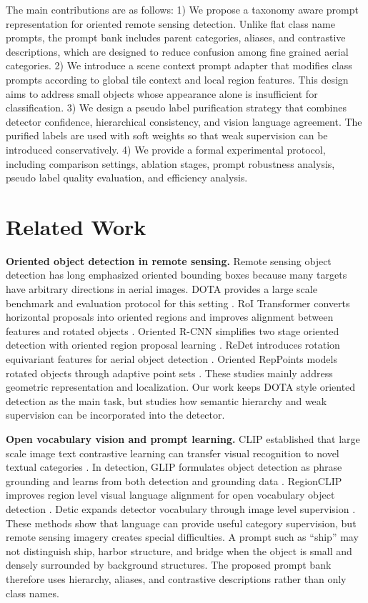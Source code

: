 \documentclass[10pt]{article}
\begin{document}
The main contributions are as follows: 
1) We propose a taxonomy aware prompt representation for oriented remote sensing detection. Unlike flat class name prompts, the prompt bank includes parent categories, aliases, and contrastive descriptions, which are designed to reduce confusion among fine grained aerial categories. 
2) We introduce a scene context prompt adapter that modifies class prompts according to global tile context and local region features. This design aims to address small objects whose appearance alone is insufficient for classification. 
3) We design a pseudo label purification strategy that combines detector confidence, hierarchical consistency, and vision language agreement. The purified labels are used with soft weights so that weak supervision can be introduced conservatively. 
4) We provide a formal experimental protocol, including comparison settings, ablation stages, prompt robustness analysis, pseudo label quality evaluation, and efficiency analysis.

\section{Related Work}

\textbf{Oriented object detection in remote sensing.}
Remote sensing object detection has long emphasized oriented bounding boxes because many targets have arbitrary directions in aerial images. DOTA provides a large scale benchmark and evaluation protocol for this setting \cite{xia2018dota}. RoI Transformer converts horizontal proposals into oriented regions and improves alignment between features and rotated objects \cite{ding2019roit}. Oriented R-CNN simplifies two stage oriented detection with oriented region proposal learning \cite{xie2021orientedrcnn}. ReDet introduces rotation equivariant features for aerial object detection \cite{han2021redet}. Oriented RepPoints models rotated objects through adaptive point sets \cite{li2022orientedreppoints}. These studies mainly address geometric representation and localization. Our work keeps DOTA style oriented detection as the main task, but studies how semantic hierarchy and weak supervision can be incorporated into the detector.

\textbf{Open vocabulary vision and prompt learning.}
CLIP established that large scale image text contrastive learning can transfer visual recognition to novel textual categories \cite{radford2021clip}. In detection, GLIP formulates object detection as phrase grounding and learns from both detection and grounding data \cite{li2022glip}. RegionCLIP improves region level visual language alignment for open vocabulary object detection \cite{zhong2022regionclip}. Detic expands detector vocabulary through image level supervision \cite{zhou2022detic}. These methods show that language can provide useful category supervision, but remote sensing imagery creates special difficulties. A prompt such as ``ship'' may not distinguish ship, harbor structure, and bridge when the object is small and densely surrounded by background structures. The proposed prompt bank therefore uses hierarchy, aliases, and contrastive descriptions rather than only class names.
\end{document}
